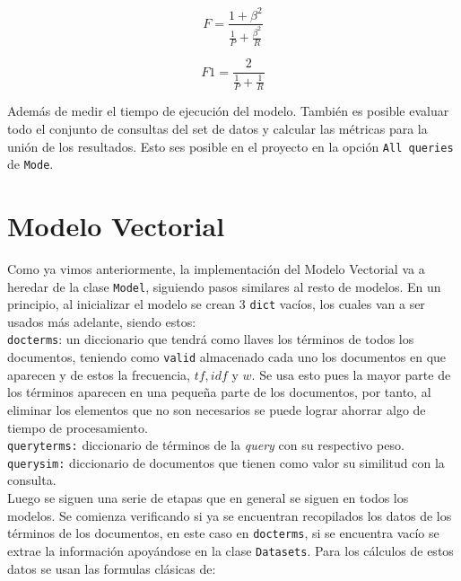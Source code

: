 \documentclass[spanish]{article}
\begin{document}
		\begin{equation}
			\displaystyle F= \frac{1+\beta^2}{\frac{1}{P}+ \frac{\beta^2}{R}}
		\end{equation}

		\begin{equation}
			\displaystyle F1= \frac{2}{\frac{1}{P}+ \frac{1}{R}}
		\end{equation}

		Además de medir el tiempo de ejecución del modelo. También es posible evaluar todo el conjunto de consultas del set de datos y calcular las métricas para la unión de los resultados. Esto ses posible en el proyecto en la opción \texttt{All queries} de \texttt{Mode}.
 

	\section*{Modelo Vectorial}

		Como ya vimos anteriormente, la implementación del Modelo Vectorial va a heredar de la clase \texttt{Model}, siguiendo pasos similares al resto de modelos. En un principio, al inicializar el modelo se crean 3 \texttt{dict} vacíos, los cuales van a ser usados más adelante, siendo estos:\\

		\texttt{docterms}: un diccionario que tendrá como llaves los términos de todos los documentos, teniendo como \texttt{valid} almacenado cada uno los documentos en que aparecen y de estos la frecuencia, $ tf, idf $ y $ w $. Se usa esto pues la mayor parte de los términos aparecen en una pequeña parte de los documentos, por tanto, al eliminar los elementos que no son necesarios se puede lograr ahorrar algo de tiempo de procesamiento.\\

		\texttt{queryterms:} diccionario de términos de la \emph{query} con su respectivo peso.\\
		
		\texttt{querysim:} diccionario de documentos que tienen como valor su similitud con la consulta.\\

		Luego se siguen una serie de etapas que en general se siguen en todos los modelos. Se comienza verificando si ya se encuentran recopilados los datos de los términos de los documentos, en este caso en \texttt{docterms}, si se encuentra vacío se extrae la información apoyándose en la clase \texttt{Datasets}. Para los cálculos de estos datos se usan las formulas clásicas de:
			
\end{document}
